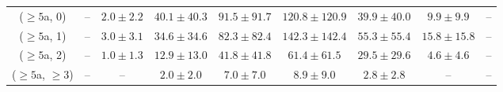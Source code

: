 \begin{table}[h!]
{\begin{tabular}{ccccccccc}
	($\ge5$a, 0) & -- & $2.0\pm 2.2$ & $40.1\pm 40.3$ & $91.5\pm 91.7$ & $120.8\pm 120.9$ & $39.9\pm 40.0$ & $9.9\pm 9.9$ & -- \\[0.5ex] 
	($\ge5$a, 1) & -- & $3.0\pm 3.1$ & $34.6\pm 34.6$ & $82.3\pm 82.4$ & $142.3\pm 142.4$ & $55.3\pm 55.4$ & $15.8\pm 15.8$ & -- \\[0.5ex] 
	($\ge5$a, 2) & -- & $1.0\pm 1.3$ & $12.9\pm 13.0$ & $41.8\pm 41.8$ & $61.4\pm 61.5$ & $29.5\pm 29.6$ & $4.6\pm 4.6$ & -- \\[0.5ex] 
	($\ge5$a, $\ge3$) & -- & -- & $2.0\pm 2.0$ & $7.0\pm 7.0$ & $8.9\pm 9.0$ & $2.8\pm 2.8$ & -- & -- \\[0.5ex] 
	\hline
	\hline
\end{tabular}}
\end{table}
